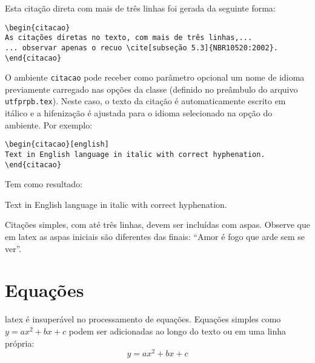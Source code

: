 \noindent Esta citação direta com mais de três linhas foi gerada da seguinte forma:

\begin{SingleSpacing}%
    \begin{verbatim}
\begin{citacao}
As citações diretas no texto, com mais de três linhas,...
... observar apenas o recuo \cite[subseção 5.3]{NBR10520:2002}.
\end{citacao}
\end{verbatim}
\end{SingleSpacing}

O ambiente \texttt{citacao} pode receber como parâmetro opcional um nome de idioma previamente carregado nas opções da classe (definido no preâmbulo do arquivo \texttt{utfprpb.tex}). Neste caso, o texto da citação é automaticamente escrito em itálico e a hifenização é ajustada para o idioma selecionado na opção do ambiente. Por exemplo:

\begin{SingleSpacing}%
    \begin{verbatim}
\begin{citacao}[english]
Text in English language in italic with correct hyphenation.
\end{citacao}
\end{verbatim}
\end{SingleSpacing}

\noindent Tem como resultado:

\begin{citacao}[english]%
    Text in English language in italic with correct hyphenation.
\end{citacao}

Citações simples, com até três linhas, devem ser incluídas com aspas. Observe que em \gls{latex} as aspas iniciais são diferentes das finais: ``Amor é fogo que arde sem se ver''.

\section{Equações}\label{sec:equacoes}

\gls{latex} é insuperável no processamento de equações. Equações simples como $y = a x^2 + b x + c$ podem ser adicionadas ao longo do texto ou em uma linha própria:
%
\[%
    y = a x^2 + b x + c
\]


